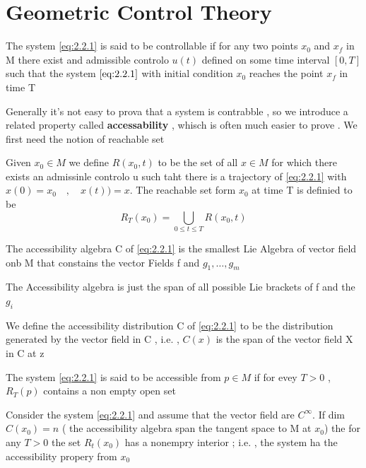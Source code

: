 \section{Geometric Control Theory}
\begin{definizione}
	The system \ref{eq:2.2.1} is said to be controllable if for any two points $x_0$ and $x_f$ in M there exist and admissible controlo $u(t)$ defined on some time interval $[0,T]$ such that the system $\ref{eq:2.2.1}$ with initial condition $x_0$ reaches the point $x_f$ in time T
\end{definizione}
Generally it's not easy to prova that a system is contrabble , so we introduce a related property called \textbf{accessability} , whisch is often much easier to prove . We first need the notion of reachable set
\begin{definizione}
	Given $x_0 \in M$ we define $R(x_0,t)$ to be the set of all $x\in M$ for which there exists an admissinle controlo u such taht there is a trajectory of  \ref{eq:2.2.1} with $x(0)=x_0 \quad , \quad x(t))=x$. The reachable set form $x_0$ at time T is definied to be 
	\[R_T(x_0) = \bigcup_{0\leq t\leq T} R(x_0,t)\]
\end{definizione}
\begin{definizione}
	The accessibility algebra C of \ref{eq:2.2.1} is the smallest Lie Algebra of vector field onb M that constains the vector Fields f and $g_1 , \dots , g_m$ 
\end{definizione}
The Accessibility algebra is just the span of all possible Lie brackets of f and the $g_i$
\begin{definizione}
	We define the accessibility distribution C of \ref{eq:2.2.1} to be the distribution generated by the vector field in C , i.e. , $C(x)$ is the span of the vector field X in  C at z 
\end{definizione}
\begin{definizione}
The system \ref{eq:2.2.1} is said to be accessible from $p \in M $ if for evey $T > 0 $ , $R_T(p)$ contains a non empty open set
\end{definizione}
\begin{teo}{}{}
Consider the system \ref{eq:2.2.1} and assume that the vector field are $C^\infty$. If dim$C(x_0) = n$ ( the accessibility algebra span the tangent space to M at $x_0$) the for any $T>0$ the set $R_t(x_0)$ has a nonempry interior ; i.e. , the system ha the accessibility propery from $x_0$
\end{teo}
